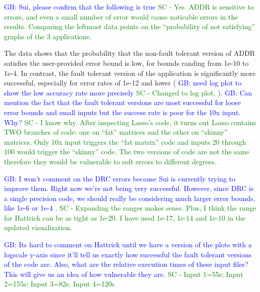 \documentclass{sig-alternate}
\newcommand{\sui}[1]{%
  \textcolor{green}{SC - #1}
}
\newcommand{\greg}[1]{%
  \textcolor{blue}{GB: #1}
}
\begin{document}
\greg{Sui, please confirm that the following is true} \sui{Yes. ADDR is sensitive to errors, and even a small number of error would cause noticable errors in the results. Comparing the leftmost data points on the ``probability of not satisfying'' graphs of the 3 applications.}
The data shows that the probability that the non-fault tolerant version of ADDR satisfies the user-provided error bound is low, for bounds randing from 1e-10 to 1e-4.
In contrast, the fault tolerant version of the application is significantly more successful, especially for error rates of 1e-12 and lower (\greg{need log plot to show the low accuracy rate more precisely} \sui{Changed to log plot.}).
\greg{Can mention the fact that the fault tolerant versions are most successful for loose error bounds and small inputs but the success rate is poor for the 10x input. Why?} \sui{I know why. After inspecting Lasso's code, it turns out Lasso contains TWO branches of code: one on ``fat'' matrices and the other on ``skinny'' matrices. Only 10x input triggers the ``fat matrix'' code and inputs 20 through 100 would trigger the ``skinny'' code. The two versions of code are not the same therefore they would be vulnerable to soft errors to different degrees.}

\greg{I won't comment on the DRC errors because Sui is currently trying to improve them. Right now we're not being very successful. However, since DRC is a single precision code, we should really be considering much larger error bounds, like 1e-6 or 1e-4}. \sui{Expanding the ranges makes sense. Plus, I think the range for Hattrick can be as tight as 1e-20. I have used 1e-17, 1e-14 and 1e-10 in the updated visualization.}

\greg{Its hard to comment on Hattrick until we have a version of the plots with a logscale y-axis since it'll tell us exactly how successful the fault tolerant versions of the code are. Also, what are the relative execution times of these input files? This will give us an idea of how vulnerable they are.} \sui{Input 1=55s; Input 2=155s; Input 3=82s; Input 4=120s }
\end{document}
